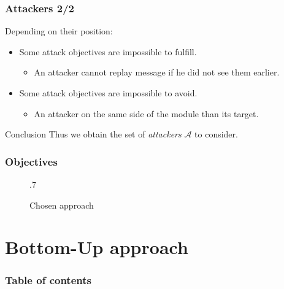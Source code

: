 \documentclass{beamer}
\begin{document}
\begin{frame}
    \frametitle{Attackers 2/2}

    Depending on their position:
    \begin{itemize}
        \item Some attack objectives are impossible to fulfill.
        \begin{itemize}
            \item An attacker cannot replay message if he did not see them earlier.
        \end{itemize}
        \item Some attack objectives are impossible to avoid.
        \begin{itemize}
            \item An attacker on the same side of the module than its target.
        \end{itemize}
    \end{itemize}
    \vfill
    \begin{block}{Conclusion}
        Thus we obtain the set of {\em attackers} $\mathcal{A}$ to consider.
    \end{block}
\end{frame}

\begin{frame}
    \frametitle{Objectives}

    \begin{figure}[htb]
        \centering
        \resizebox {!} {.7\textheight} {
            
        }
        \caption{Chosen approach}
    \end{figure}
\end{frame}

\section{Bottom-Up approach}

\begin{frame}
    \frametitle{Table of contents}

    \tableofcontents[currentsection]
\end{frame}
\end{document}
